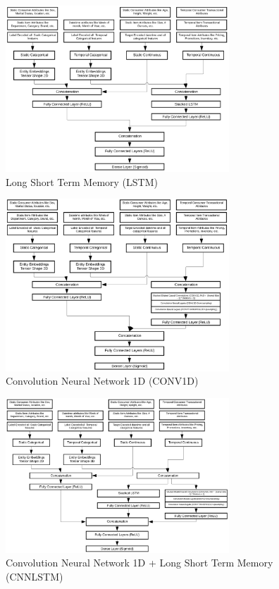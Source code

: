   \begin{figure}[t]
    \centering 
    \includegraphics[width=3.3in]{img/LSTM.png} 
    \caption{Long Short Term Memory (LSTM)} 
    \label{fig:LSTM} 
  \end{figure}

  \begin{figure}[t]
    \centering 
    \includegraphics[width=3.3in]{img/CONV1D.png} 
    \caption{Convolution Neural Network 1D (CONV1D)} 
    \label{fig:CONV1D} 
  \end{figure}

  \begin{figure}[t]
    \centering 
    \includegraphics[width=3.3in]{img/CNNLSTM.png} 
    \caption{Convolution Neural Network 1D + Long Short Term Memory (CNNLSTM)} 
    \label{fig:CNNLSTM} 
  \end{figure}

